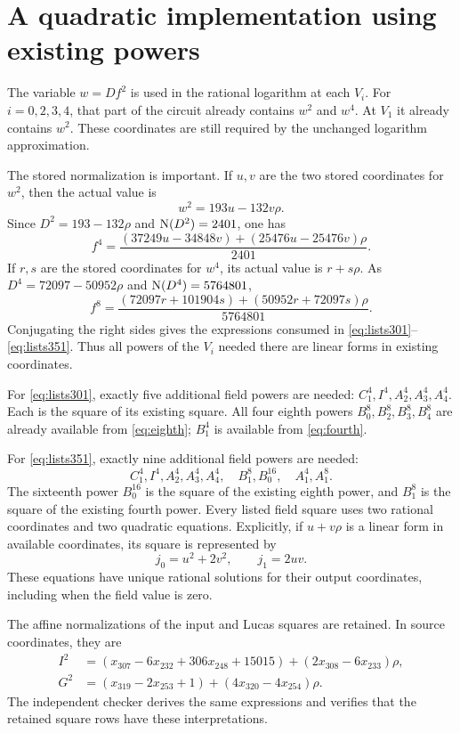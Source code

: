 \documentclass[11pt,a4paper]{article}
\theoremstyle{remark}\newtheorem{remark}[theorem]{Remark}
\begin{document}
\section{A quadratic implementation using existing powers}
The variable $w=Df^2$ is used in the rational logarithm at each
$V_i$. For $i=0,2,3,4$, that part of the circuit already contains
$w^2$ and $w^4$. At $V_1$ it already contains $w^2$. These coordinates
are still required by the unchanged logarithm approximation.

The stored normalization is important. If $u,v$ are the two stored
coordinates for $w^2$, then the actual value is
\[
                           w^2=193u-132v\rho.
\]
Since $D^2=193-132\rho$ and $\operatorname{N}(D^2)=2401$, one has
\begin{equation}\label{eq:fourth}
 f^4=\frac{(37249u-34848v)+(25476u-25476v)\rho}{2401}.
\end{equation}
If $r,s$ are the stored coordinates for $w^4$, its actual value is
$r+s\rho$. As $D^4=72097-50952\rho$ and
$\operatorname{N}(D^4)=5764801$,
\begin{equation}\label{eq:eighth}
 f^8=\frac{(72097r+101904s)+(50952r+72097s)\rho}{5764801}.
\end{equation}
Conjugating the right sides gives the expressions consumed in
\eqref{eq:lists301}--\eqref{eq:lists351}. Thus all powers of the $V_i$ needed
there are linear forms in existing coordinates.

For \eqref{eq:lists301}, exactly five additional field powers are
needed: $C_1^4,I^4,A_2^4,A_3^4,A_4^4$. Each is the square of its
existing square. All four eighth powers $B_0^8,B_2^8,B_3^8,B_4^8$
are already available from \eqref{eq:eighth}; $B_1^4$ is available
from \eqref{eq:fourth}.

For \eqref{eq:lists351}, exactly nine additional field powers are
needed:
\[
 C_1^4,I^4,A_2^4,A_3^4,A_4^4,\quad
 B_1^8,B_0^{16},\quad A_1^4,A_1^8.
\]
The sixteenth power $B_0^{16}$ is the square of the existing eighth
power, and $B_1^8$ is the square of the existing fourth power.
Every listed field square uses two rational coordinates and two
quadratic equations. Explicitly, if $u+v\rho$ is a linear form in
available coordinates, its square is represented by
\[
                  j_0=u^2+2v^2,\qquad j_1=2uv.
\]
These equations have unique rational solutions for their output
coordinates, including when the field value is zero.

The affine normalizations of the input and Lucas squares are retained.
In source coordinates, they are
\[
 \begin{aligned}
 I^2&=(x_{307}-6x_{232}+306x_{248}+15015)
            +(2x_{308}-6x_{233})\rho,\\
 G^2&=(x_{319}-2x_{253}+1)+(4x_{320}-4x_{254})\rho.
 \end{aligned}
\]
The independent checker derives the same expressions and verifies
that the retained square rows have these interpretations.
\end{document}
